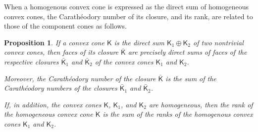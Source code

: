 \documentclass[oneside]{amsart}
\theoremstyle{plain}
\newtheorem{proposition}[theorem]{Proposition}
\theoremstyle{definition}
\theoremstyle{remark}
\numberwithin{equation}{section}
\begin{document}
When a homogenous convex cone is expressed as the direct sum of
homogeneous convex cones, the Carath\'eodory number of its closure, and its
rank, are related to those of the component cones as follows.
\begin{proposition}
If a convex cone $\mathsf{K}$ is the direct sum $\mathsf{K}_{1} \oplus
\mathsf{K}_{2}$ of two nontrivial convex cones, then faces of its closure
$\bar{\mathsf{K}}$ are precisely direct sums of faces of the respective
closures $\bar{\mathsf{K}}_{1}$ and $\bar{\mathsf{K}}_{2}$ of the convex
cones $\mathsf{K}_{1}$ and $\mathsf{K}_{2}$.

Moreover, the Carath\'eodory number of the closure $\bar{\mathsf{K}}$ is
the sum of the Carath\'eodory numbers of the closures
$\bar{\mathsf{K}}_{1}$ and $\bar{\mathsf{K}}_{2}$.

If, in addition, the convex cones $\mathsf{K}$, $\mathsf{K}_{1}$, and
$\mathsf{K}_{2}$ are homogeneous, then the rank of the homogeneous convex
cone $\mathsf{K}$ is the sum of the ranks of the homogenous convex cones
$\mathsf{K}_{1}$ and $\mathsf{K}_{2}$.
\end{proposition}
\end{document}
